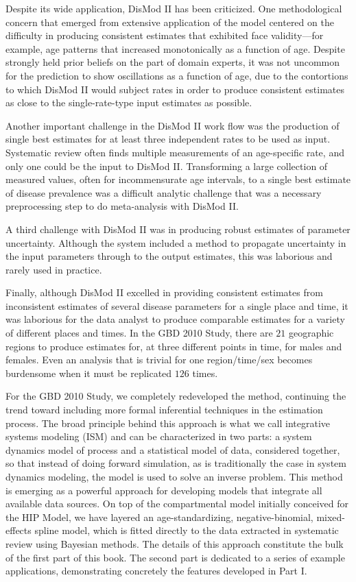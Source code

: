 Despite its wide application, DisMod II has been
criticized.  One methodological concern that emerged from extensive
application of the model centered on the difficulty in producing
consistent estimates that exhibited face validity---for example, age
patterns that increased monotonically as a function of age. Despite
strongly held prior beliefs on the part of domain experts, it was not
uncommon for the prediction to show oscillations as a function of age, due
to the contortions to which DisMod II would subject rates in order to
produce consistent estimates as close to the single-rate-type input
estimates as possible.

Another important challenge in the DisMod II work flow was the
production of single best estimates for at least three independent
rates to be used as input.  Systematic review often finds multiple
measurements of an age-specific rate, and only one could be the input to
DisMod II.  Transforming a large collection of measured values, often
for incommensurate age intervals, to a single best estimate of disease
prevalence was a difficult analytic challenge that was a necessary
preprocessing step to do meta-analysis with DisMod II.

A third challenge with DisMod II was in producing robust estimates of
parameter uncertainty.  Although the system included a method to
propagate uncertainty in the input parameters through to the output
estimates, this was laborious and rarely used in practice.

Finally, although DisMod II excelled in providing consistent estimates
from inconsistent estimates of several disease
parameters for a single place and time, it was laborious
for the data analyst to produce comparable estimates for a variety of
different places and times. In the GBD 2010
Study, there are $21$ geographic regions to produce estimates for, at
three different points in time, for males and females. Even an
analysis that is trivial for one region/time/sex becomes burdensome
when it must be replicated $126$ times.

For the GBD 2010 Study, we completely redeveloped the method,
continuing the trend toward including more formal inferential
techniques in the estimation process.  The broad principle behind this
approach is what we call integrative systems modeling (ISM) and can be
characterized in two parts: a system dynamics model of process and a
statistical model of data, considered together, so that instead of
doing forward simulation, as is traditionally the case in system
dynamics modeling, the model is used to solve an inverse problem. This
method is emerging as a powerful approach for developing models that
integrate all available data sources.  On top of the compartmental
model initially conceived for the HIP Model, we have layered an
age-standardizing, negative-binomial, mixed-effects spline model,
which is fitted directly to the data extracted in systematic review
using Bayesian methods.  The details of this approach constitute the
bulk of the first part of this book.  The second part is dedicated to
a series of example applications, demonstrating concretely the
features developed in Part I.

